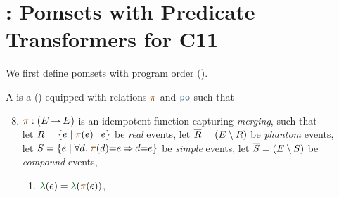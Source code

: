 \section{\PwTcTITLE: Pomsets with Predicate Transformers for C11}
\label{sec:c11}

We first define pomsets with program order (\PwTpo{}).

\begin{definition}
  \label{def:po}
  A \PwTpo{} is a \PwT{} () equipped
  with relations $\rmrg$ and
  $\rpox$ such that 
  \begin{enumerate}[,label=(\textsc{m}\arabic*),ref=\textsc{m}\arabic*]
    \setcounter{enumi}{7}
  \item \label{pom-m} 
    $\fmrg{} : (\aEvs\fun\aEvs)$
    is an idempotent function capturing \emph{merging}, such that 
    \\
    let $\reEvs=\{\aEv\mid\fmrg{\aEv}{=}\aEv\}$ be \emph{real} events,
    let $\overline{R}=(E\setminus R)$ be \emph{phantom} events,\\
    let $\umEvs=\{\aEv\mid\forall\bEv.\;\fmrg{\bEv}{=}\aEv \limplies \bEv{=}\aEv\}$ be \emph{simple} events,
    let $\overline{S}=(E\setminus S)$ be \emph{compound} events,
    \begin{multicols}{2}
    \begin{enumerate}%
    \item \label{pom-m-lambda} 
      $\labeling(\aEv)=\labeling(\fmrg{\aEv})$,

\end{enumerate}
\end{multicols}
\end{enumerate}
\end{definition}
